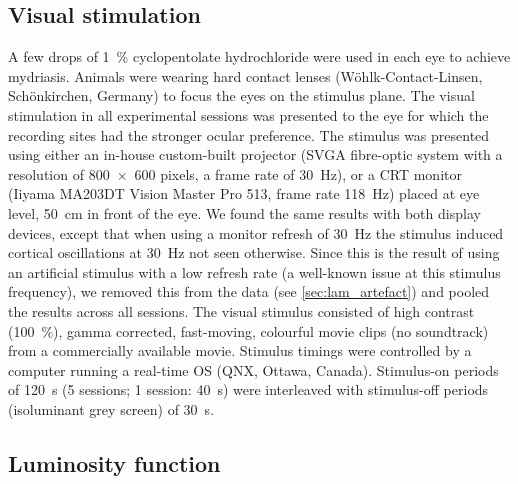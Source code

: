 \subsection{Visual stimulation}

A few drops of \SI{1}{\percent} cyclopentolate hydrochloride were used in each eye to achieve mydriasis.
Animals were wearing hard contact lenses (W\"ohlk-Contact-Linsen, Sch\"onkirchen, Germany) to focus the eyes on the stimulus plane.
The visual stimulation in all experimental sessions was presented to the eye for which the recording sites had the stronger ocular preference.
The stimulus was presented using either an in-house custom-built projector (SVGA fibre-optic system with a resolution of \num{800x600} pixels, a frame rate of \SI{30}{Hz}), or a \ac{CRT} monitor (Iiyama MA203DT Vision Master Pro 513, frame rate \SI{118}{Hz}) placed at eye level, \SI{50}{\centi\metre} in front of the eye.
We found the same results with both display devices, except that when using a monitor refresh of \SI{30}{Hz} the stimulus induced cortical oscillations at \SI{30}{Hz} not seen otherwise.
Since this is the result of using an artificial stimulus with a low refresh rate (a well-known issue at this stimulus frequency), we removed this from the data (see \autoref{sec:lam_artefact}) and pooled the results across all sessions.
The visual stimulus consisted of high contrast (\SI{100}{\percent}), gamma corrected, fast-moving, colourful movie clips (no soundtrack) from a commercially available movie.
Stimulus timings were controlled by a computer running a real-time OS (QNX, Ottawa, Canada).
Stimulus-on periods of \SI{120}{\second} (\num{5} sessions; \num{1} session: \SI{40}{\second}) were interleaved with stimulus-off periods (isoluminant grey screen) of \SI{30}{\second}.


\subsection{Luminosity function}
\label{sec:lam_lumos}

